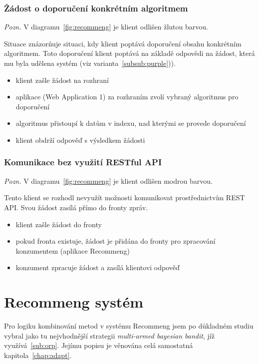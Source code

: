 \documentclass[thesis=M,czech]{FITthesis}[2014/05/07]
\begin{document}
\subsubsection{Žádost o doporučení konkrétním algoritmem}
\label{subsub:yellow}

\emph{Pozn.} V diagramu~\ref{fig:recommeng} je klient odlišen žlutou barvou.

Situace znázorňuje situaci, kdy klient poptává doporučení obsahu konkrétním algoritmem. Toto doporučení klient poptává na základě odpovědi na žádost, která mu byla udělena systém (viz varianta~\ref{subsub:purple})). 

\begin{itemize}
	\item klient zašle žádost na rozhraní
	\item aplikace (Web Application 1) za rozhraním zvolí vybraný algoritmus pro doporučení
	\item algoritmus přistoupí k datům v indexu, nad kterými se provede doporučení
	\item klient obdrží odpověď s výsledkem žádosti
\end{itemize}

\subsubsection{Komunikace bez využití RESTful API}

\emph{Pozn.} V diagramu~\ref{fig:recommeng} je klient odlišen modrou barvou.

Tento klient se rozhodl nevyužít možnosti komunikovat prostřednictvím REST API. Svou žádost zasílá přímo do fronty zpráv.

\begin{itemize}
	\item klient zašle žádost do fronty
	\item pokud fronta existuje, žádost je přidána do fronty pro zpracování konzumentem (aplikace Recommeng)
	\item konzument zpracuje žádost a zasílá klientovi odpověď
\end{itemize}

\section{Recommeng systém}
\label{sec:recommeng}

Pro logiku kombinování metod v systému Recommeng jsem po důkladném studiu vybral jako tu nejvhodnější strategii \emph{multi-armed bayesian bandit}, jíž využívá~\ref{sub:orp}. Jejímu popisu je věnována celá samostatná kapitola~\ref{chap:adapt}.
\end{document}
